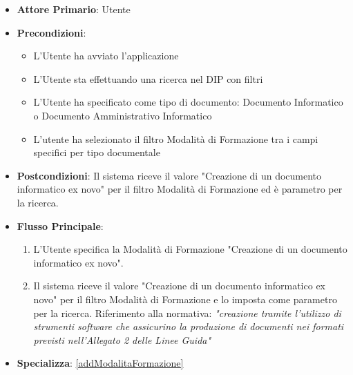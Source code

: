 \begin{itemize}
      \item \textbf{Attore Primario}: Utente
      \item \textbf{Precondizioni}: 
      \begin{itemize}
            \item L'Utente ha avviato l'applicazione
            \item L'Utente sta effettuando una ricerca nel DIP con filtri
            \item L'Utente ha specificato come tipo di documento: Documento Informatico o Documento Amministrativo Informatico
            \item L'utente ha selezionato il filtro Modalità di Formazione tra i campi specifici per tipo documentale
      \end{itemize}
      \item \textbf{Postcondizioni}: Il sistema riceve il valore "Creazione di un documento informatico ex novo" per il filtro Modalità di Formazione ed è parametro per la ricerca.
      \item \textbf{Flusso Principale}:
      \begin{enumerate}
            \item L'Utente specifica la Modalità di Formazione "Creazione di un documento informatico ex novo".
            \item Il sistema riceve il valore "Creazione di un documento informatico ex novo" per il filtro Modalità di Formazione e lo imposta come parametro per la ricerca. Riferimento alla normativa: \textit{"creazione tramite l'utilizzo di strumenti software che assicurino la produzione di documenti nei formati previsti nell'Allegato 2 delle Linee Guida"}
      \end{enumerate}
      \item \textbf{Specializza}: \ref{addModalitaFormazione}
\end{itemize}

